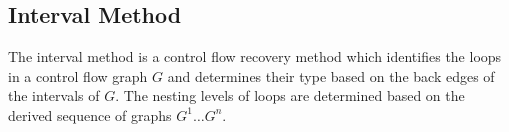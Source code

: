 
\subsection{Interval Method}
\label{sec:interval_method}


The interval method is a control flow recovery method which identifies the loops in a control flow graph $G$ and determines their type based on the back edges of the intervals of $G$. The nesting levels of loops are determined based on the derived sequence of graphs $G^1 \dots G^n$.


